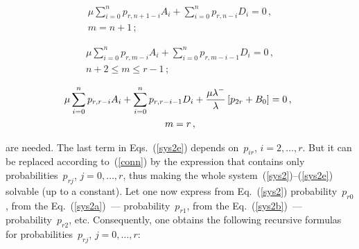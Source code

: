 \begin{multicols}{2}
\noindent
\begin{multline}
\label{sys2c}
\mu \sum\limits_{i=0}^{n} p_{r,n+1-i} A_i
+ \sum\limits_{i=0}^{n} p_{r,n-i} D_i =0\,, \\ m=n+1\,;
\end{multline}

\vspace*{-12pt}

\noindent
\begin{multline}
\label{sys2d}
\mu \sum\limits_{i=0}^{n} p_{r,m-i} A_i +
\sum\limits_{i=0}^{n} p_{r,m-i-1} D_i =0\,, \\ n+2 \le m \le r-1\,;
\end{multline}

\vspace*{-12pt}

\noindent
\begin{multline}
\label{sys2e}
\hspace*{-4.53584pt}\mu \sum\limits_{i=0}^{n} p_{r,r-i} A_i +
\sum\limits_{i=0}^{n} p_{r,r-i-1} D_i + \displaystyle\frac{\displaystyle \mu \lambda^- \mathstrut}{\displaystyle \lambda\mathstrut}
\left[ p_{2r} + B_0\right] =0\,, \\ 
m=r\,,
\end{multline}

\noindent
are needed. The last term in Eqs.~(\ref{sys2e})
depends on~$p_{ir}$, $i= 2 ,\dots , r$.
But it can be replaced according to~(\ref{conn}) by the expression
that contains only
 probabilities~$p_{rj}$, $j= 0 ,\dots , r$,
thus making the whole system~(\ref{sys2})--(\ref{sys2e}) solvable (up to a constant).
Let one  now express from Eq.~(\ref{sys2}) probability~$p_{r0}$,
from the Eq.~(\ref{sys2a})~--- probability~$p_{r1}$,
from the Eq.~(\ref{sys2b})~--- probability~$p_{r2}$, etc.
Consequently, one obtains the following recursive formulas for
probabilities~$p_{rj}$, $j= 0 ,\dots , r$:

\pagebreak


\end{multicols}
